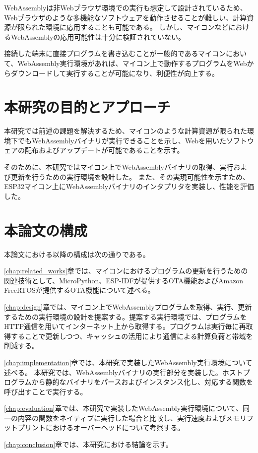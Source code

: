WebAssemblyは非Webブラウザ環境での実行も想定して設計されているため、Webブラウザのような多機能なソフトウェアを動作させることが難しい、計算資源が限られた環境に応用することも可能である。
しかし、マイコンなどにおけるWebAssemblyの応用可能性は十分に検証されていない。

接続した端末に直接プログラムを書き込むことが一般的であるマイコンにおいて、WebAssembly実行環境があれば、マイコン上で動作するプログラムをWebからダウンロードして実行することが可能になり、利便性が向上する。

\section{本研究の目的とアプローチ}

本研究では前述の課題を解決するため、マイコンのような計算資源が限られた環境下でもWebAssemblyバイナリが実行できることを示し、Webを用いたソフトウェアの配布およびアップデートが可能であることを示す。

そのために、本研究ではマイコン上でWebAssemblyバイナリの取得、実行および更新を行うための実行環境を設計した。
また、その実現可能性を示すため、ESP32マイコン上にWebAssemblyバイナリのインタプリタを実装し、性能を評価した。

\section{本論文の構成}

本論文における以降の構成は次の通りである。

\ref{chap:related_works}章では、マイコンにおけるプログラムの更新を行うための関連技術として、MicroPython、ESP-IDFが提供するOTA機能およびAmazon FreeRTOSが提供するOTA機能について述べる。

\ref{chap:design}章では、マイコン上でWebAssemblyプログラムを取得、実行、更新するための実行環境の設計を提案する。提案する実行環境では、プログラムをHTTP通信を用いてインターネット上から取得する。プログラムは実行毎に再取得することで更新しつつ、キャッシュの活用により通信による計算負荷と帯域を削減する。

\ref{chap:implementation}章では、本研究で実装したWebAssembly実行環境について述べる。
本研究では、WebAssemblyバイナリの実行部分を実装した。ホストプログラムから静的なバイナリをパースおよびインスタンス化し、対応する関数を呼び出すことで実行する。

\ref{chap:evaluation}章では、本研究で実装したWebAssembly実行環境について、同一の内容の関数をネイティブに実行した場合と比較し、実行速度およびメモリフットプリントにおけるオーバーヘッドについて考察する。

\ref{chap:conclusion}章では、本研究における結論を示す。

